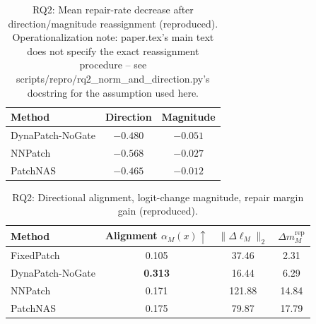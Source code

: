 \documentclass{article}
\begin{document}
\begin{table}[h]
\centering
\caption{RQ2: Mean repair-rate decrease after direction/magnitude reassignment (reproduced).
Operationalization note: paper.tex's main text does not specify the exact reassignment procedure
-- see scripts/repro/rq2\_norm\_and\_direction.py's docstring for the assumption used here.}
\label{tab:repro_rq2_direction}
\small
\begin{tabular}{lcc}
\toprule
Method & Direction & Magnitude \\
\midrule
DynaPatch-NoGate & $-0.480$ & $-0.051$ \\
NNPatch & $-0.568$ & $-0.027$ \\
PatchNAS & $-0.465$ & $-0.012$ \\
\bottomrule
\end{tabular}
\end{table}

\begin{table}[h]
\centering
\caption{RQ2: Directional alignment, logit-change magnitude, repair margin gain (reproduced).}
\label{tab:repro_rq2_norm}
\small
\begin{tabular}{lccc}
\toprule
Method & Alignment $\alpha_M(x) \uparrow$ & $\|\Delta\ell_M\|_2$ & $\Delta m_M^{\mathrm{rep}}$ \\
\midrule
FixedPatch & 0.105 & 37.46 & 2.31 \\
DynaPatch-NoGate & \textbf{0.313} & 16.44 & 6.29 \\
NNPatch & 0.171 & 121.88 & 14.84 \\
PatchNAS & 0.175 & 79.87 & 17.79 \\
\bottomrule
\end{tabular}
\end{table}
\end{document}
